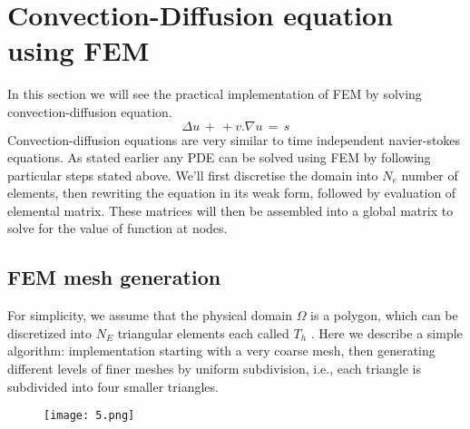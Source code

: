 \documentclass[9pt]{article}
\begin{document}
\newpage
\section{Convection-Diffusion equation using FEM}
In this section we will see the practical implementation of FEM by solving convection-diffusion equation.
\[
\Delta{u}\,+\,+v . \nabla u\,=\,s
\]
Convection-diffusion equations are very similar to time independent navier-stokes equations. 
As stated earlier any PDE can be solved using FEM by following particular steps stated above.
We'll first discretise the domain into $N_e$ number of elements, then rewriting the equation in its weak form, followed by evaluation of elemental matrix. These matrices will then be assembled into a global matrix to solve for the value of function at nodes. 
\\
\subsection{FEM mesh generation}
For simplicity, we assume that the physical domain $\Omega$ is a polygon, which
can be discretized into $N_E$ triangular elements each called $T_h$ . Here we describe a simple algorithm: implementation starting with a very coarse mesh, then generating
different levels of finer meshes by uniform subdivision, i.e., each triangle is
subdivided into four smaller triangles.
\begin{figure}[h]
\centering
\texttt{[image: 5.png]}
\end{figure}
\end{document}
